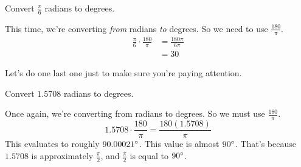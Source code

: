 \clearpage
\begin{problem}
    Convert $\frac{\pi}{6}$ radians to degrees.
\end{problem}
\begin{solution}
    This time, we're converting \textit{from} radians \textit{to} degrees. So we need to use $\frac{180}{\pi}$.
    \begin{align*}
        \frac{\pi}{6} \cdot \frac{180}{\pi} &= \frac{180\pi}{6\pi} \\
        &= 30
    \end{align*}
\end{solution}
Let's do one last one just to make sure you're paying attention.
\begin{problem}
    Convert $1.5708$ radians to degrees.
\end{problem}
\begin{solution}
    Once again, we're converting from radians to degrees. So we must use $\frac{180}{\pi}$.
    \[
        1.5708 \cdot \frac{180}{\pi} = \frac{180(1.5708)}{\pi}
    \]
    This evaluates to roughly $90.00021\degree$. This value is almost $90\degree$. That's because $1.5708$ is approximately $\frac{\pi}{2}$, and $\frac{\pi}{2}$ is equal to $90\degree$.
\end{solution}